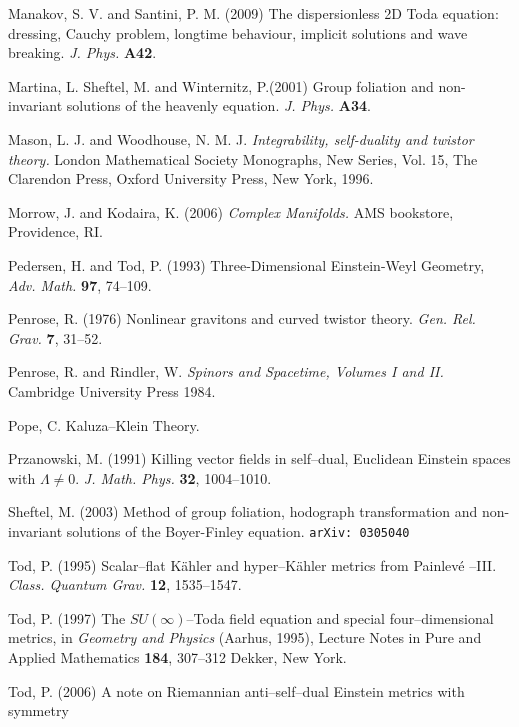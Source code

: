 \begin{thebibliography}{}
 Manakov, S. V. and Santini, P. M. (2009)
The dispersionless 2D Toda equation: dressing, Cauchy problem, longtime behaviour, implicit solutions and wave breaking. \textit{J. Phys.} {\bf A42}.

Martina, L. Sheftel, M. and Winternitz, P.(2001)
Group foliation and non-invariant
solutions of the heavenly equation.
\textit{J. Phys.} {\bf A34}.

 Mason, L. J. and Woodhouse, N. M. J.  \textit{Integrability, self-duality and twistor theory.} London Mathematical Society Monographs, New Series, Vol. 15, The Clarendon Press, Oxford University Press, New York, 1996.

 Morrow, J. and Kodaira, K. (2006)
\textit{Complex Manifolds.} AMS bookstore, Providence, RI.

 Pedersen, H. and Tod, P. (1993)
Three-Dimensional Einstein-Weyl Geometry,
\textit{Adv. Math.} {\bf 97}, 74--109.


 Penrose, R. (1976) Nonlinear 
gravitons and curved twistor theory. \textit{Gen. Rel. Grav.}  {\bf 7},  31--52.

 Penrose, R. and Rindler, W.
\textit{Spinors and Spacetime, Volumes I and II.} Cambridge University Press 1984.

 Pope, C. Kaluza--Klein Theory.


 Przanowski, M. (1991)
Killing vector fields in self--dual, Euclidean Einstein spaces with $\Lambda\neq 0$.
\textit{J. Math. Phys.} {\bf 32}, 1004--1010.

 Sheftel, M. (2003)
Method of group foliation, hodograph transformation and non-invariant solutions of the Boyer-Finley equation.
{\tt arXiv: 0305040}

 Tod, P. (1995)
Scalar--flat K\"ahler and hyper--K\"ahler metrics from Painlev\'e --III.
\textit{Class. Quantum Grav.} {\bf 12}, 1535--1547.

 Tod, P. (1997)
The $SU(\infty)$--Toda field equation and special four--dimensional metrics,
in {\em Geometry and Physics} (Aarhus, 1995), Lecture Notes in Pure and Applied Mathematics {\bf 184}, 307--312 Dekker, New York.

 Tod, P. (2006) {A note on Riemannian anti--self--dual Einstein metrics with symmetry}


\end{thebibliography}
